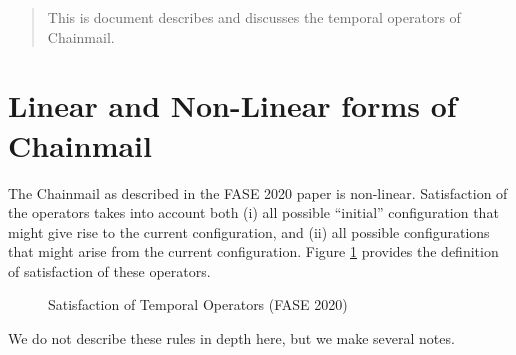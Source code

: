 \documentclass[12pt]{article}
\begin{document}
\maketitle

\begin{abstract}
This is document describes and discusses the temporal operators of Chainmail.
\end{abstract}

\section{Linear and Non-Linear forms of Chainmail}

The Chainmail as described in the FASE 2020 paper is non-linear. Satisfaction 
of the operators takes into account both (i) all possible ``initial'' configuration that 
might give rise to the current configuration, and (ii) all possible configurations that 
might arise from the current configuration. Figure \ref{f:sat_temporal_fase} provides the definition of 
satisfaction of these operators.

\begin{figure}
\caption{Satisfaction of Temporal Operators (FASE 2020)}
\label{f:sat_temporal_fase}
\end{figure}
We do not describe these rules in depth here, but we make several notes.
\end{document}

